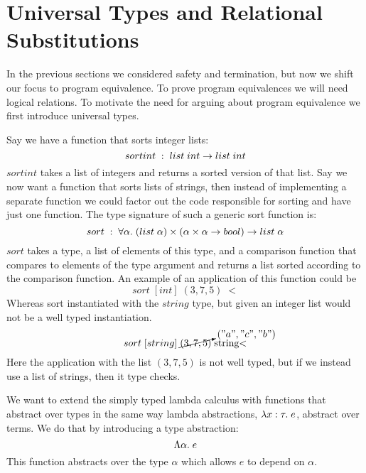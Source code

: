 \section*{Universal Types and Relational Substitutions}
In the previous sections we considered safety and termination, but now we shift our focus to program equivalence. To prove program equivalences we will need logical relations. To motivate the need for arguing about program equivalence we first introduce universal types.

Say we have a function that sorts integer lists:
\[
  sortint \; : \;  list \; int \rightarrow list \; int
\]
$sortint$ takes a list of integers and returns a sorted version of that list. Say we now want a function that sorts lists of strings, then instead of implementing a separate function we could factor out the code responsible for sorting and have just one function. The type signature of such a generic sort function is:
\[
  sort \; : \; \forall \alpha.\;  (list \; \alpha) \times ( \alpha \times \alpha \rightarrow bool ) \rightarrow list \; \alpha
\]
$sort$ takes a type, a list of elements of this type, and a comparison function that compares to elements of the type argument and returns a list sorted according to the comparison function. An example of an application of this function could be
\[
  sort \; [int] \; (3,7,5) \; <
\]
Whereas sort instantiated with the $string$ type, but given an integer list would not be a well typed instantiation.
\[
  sort \; [string] \; \cancelto{("a","c","b")}{(3,7,5)} \; \text{string<}
\]
Here the application with the list $(3,7,5)$ is not well typed, but if we instead use a list of strings, then it type checks. 

We want to extend the simply typed lambda calculus with functions that abstract over types in the same way lambda abstractions, $\lambda x : \tau . \; e$, abstract over terms. We do that by introducing a type abstraction:
\[
  \Lambda \alpha . \; e
\]
This function abstracts over the type $\alpha$ which allows $e$ to depend on $\alpha$.

